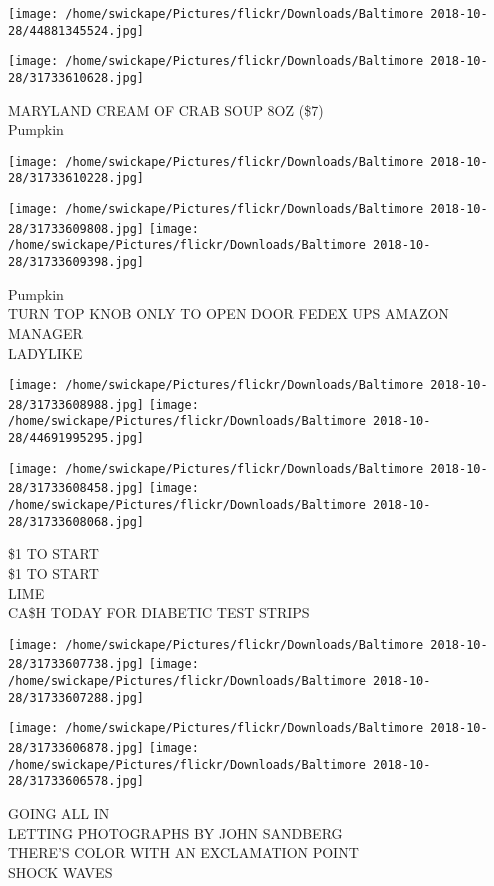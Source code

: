 \documentclass[10pt,letterpaper]{article}
\begin{document}
\texttt{[image: /home/swickape/Pictures/flickr/Downloads/Baltimore 2018-10-28/44881345524.jpg]}

\vspace{0.25in}
\texttt{[image: /home/swickape/Pictures/flickr/Downloads/Baltimore 2018-10-28/31733610628.jpg]}

MARYLAND CREAM OF CRAB SOUP 8OZ (\$7)\\
Pumpkin
\pagebreak

\texttt{[image: /home/swickape/Pictures/flickr/Downloads/Baltimore 2018-10-28/31733610228.jpg]}

\vspace{0.25in}
\texttt{[image: /home/swickape/Pictures/flickr/Downloads/Baltimore 2018-10-28/31733609808.jpg]}
\texttt{[image: /home/swickape/Pictures/flickr/Downloads/Baltimore 2018-10-28/31733609398.jpg]}

Pumpkin\\
TURN TOP KNOB ONLY TO OPEN DOOR FEDEX UPS AMAZON MANAGER\\
LADYLIKE
\pagebreak

\texttt{[image: /home/swickape/Pictures/flickr/Downloads/Baltimore 2018-10-28/31733608988.jpg]}
\texttt{[image: /home/swickape/Pictures/flickr/Downloads/Baltimore 2018-10-28/44691995295.jpg]}

\texttt{[image: /home/swickape/Pictures/flickr/Downloads/Baltimore 2018-10-28/31733608458.jpg]}
\texttt{[image: /home/swickape/Pictures/flickr/Downloads/Baltimore 2018-10-28/31733608068.jpg]}

\$1 TO START\\
\$1 TO START\\
LIME\\
CA\$H TODAY FOR DIABETIC TEST STRIPS
\pagebreak

\texttt{[image: /home/swickape/Pictures/flickr/Downloads/Baltimore 2018-10-28/31733607738.jpg]}
\texttt{[image: /home/swickape/Pictures/flickr/Downloads/Baltimore 2018-10-28/31733607288.jpg]}

\texttt{[image: /home/swickape/Pictures/flickr/Downloads/Baltimore 2018-10-28/31733606878.jpg]}
\texttt{[image: /home/swickape/Pictures/flickr/Downloads/Baltimore 2018-10-28/31733606578.jpg]}

GOING ALL IN\\
LETTING PHOTOGRAPHS BY JOHN SANDBERG\\
THERE'S COLOR WITH AN EXCLAMATION POINT\\
SHOCK WAVES
\pagebreak
\end{document}
